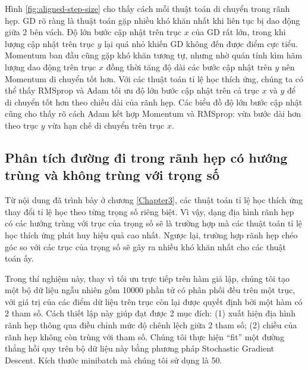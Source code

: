 Hình \ref{fig:aligned-step-size} cho thấy cách mỗi thuật toán di chuyển trong rãnh hẹp. GD rõ ràng là thuật toán gặp nhiều khó khăn nhất khi liên tục bị dao động giữa 2 bên vách. Độ lớn bước cập nhật trên trục $x$ của GD rất lớn, trong khi lượng cập nhật trên trục $y$ lại quá nhỏ khiến GD không đến được điểm cực tiểu. Momentum ban đầu cũng gặp khó khăn tương tự, nhưng nhờ quán tính kìm hãm lượng dao động trên trục $x$ đồng thời tăng độ dài các bước cập nhật trên $y$ nên Momentum di chuyển tốt hơn. Với các thuật toán tỉ lệ học thích ứng, chúng ta có thể thấy RMSprop và Adam tối ưu độ lớn bước cập nhật trên cả trục $x$ và $y$ để di chuyển tốt hơn theo chiều dài của rãnh hẹp. Các biểu đồ độ lớn bước cập nhật cũng cho thấy rõ cách Adam kết hợp Momentum và RMSprop: vừa bước dài hơn theo trục $y$ vừa hạn chế di chuyển trên trục $x$.

\subsection{Phân tích đường đi trong rãnh hẹp có hướng trùng và không trùng với trọng số}
\label{exp:aligned-nonaligned}

Từ nội dung đã trình bày ở chương \ref{Chapter3}, các thuật toán tỉ lệ học thích ứng thay đổi tỉ lệ học theo từng trọng số riêng biệt. Vì vậy, dạng địa hình rãnh hẹp có các hướng trùng với trục của trọng số sẽ là trường hợp mà các thuật toán tỉ lệ học thích ứng phát huy hiệu quả cao nhất. Ngược lại, trường hợp rãnh hẹp chéo góc so với các trục của trọng số sẽ gây ra nhiều khó khăn nhất cho các thuật toán ấy.

Trong thí nghiệm này, thay vì tối ưu trực tiếp trên hàm giả lập, chúng tôi tạo một bộ dữ liệu ngẫu nhiên gồm 10000 phần tử có phân phối đều trên một trục, với giá trị của các điểm dữ liệu trên trục còn lại được quyết định bởi một hàm có 2 tham số. Cách thiết lập này giúp đạt được 2 mục đích: (1) xuất hiện địa hình rãnh hẹp thông qua điều chỉnh mức độ chênh lệch giữa 2 tham số; (2) chiều của rãnh hẹp không còn trùng với tham số. Chúng tôi thực hiện ``fit'' một đường thẳng hồi quy trên bộ dữ liệu này bằng phương pháp Stochastic Gradient Descent. Kích thước minibatch mà chúng tôi sử dụng là 50.

